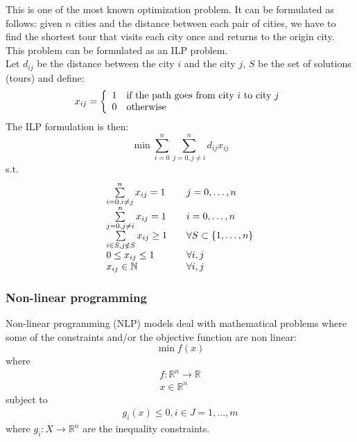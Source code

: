 \begin{example}
This is one of the most known optimization problem. It can be formulated as follows: given $n$ cities and the distance between each pair of cities, we have to find the shortest tour that visits each city once and returns to the origin city. This problem can be formulated as an ILP problem.\\
Let $d_{ij}$ be the distance between the city $i$ and the city $j$, $S$ be the set of solutions (tours) and define:
\begin{equation*}
x_{ij} = \left\{
	\begin{array}{l l}
	1 & \text{if the path goes from city $i$ to city $j$}\\
	0 & \text{otherwise}
	\end{array}
\right.
\end{equation*}
The ILP formulation is then:
\begin{equation*}
\min \sum\limits_{i=0}^{n} \sum\limits_{j=0, j \neq i}^{n} d_{ij} x_{ij}
\end{equation*}
s.t.
\begin{equation*}
\begin{array}{l l}
\sum\limits_{i=0, i \neq j}^{n} x_{ij} = 1 & \quad j = 0, \dots, n\\
\sum\limits_{j=0, j \neq i}^{n} x_{ij} = 1 & \quad i = 0, \dots, n\\
\sum\limits_{i \in S, j \notin S} x_{ij} \geq 1 & \quad \forall S \subset \{1, \dots, n\}\\
0 \leq x_{ij} \leq 1 & \quad \forall i,j\\
x_{ij} \in \mathbb{N} & \quad \forall i,j
\end{array}
\end{equation*}

\end{example}

\subsubsection{Non-linear programming}
Non-linear programming (NLP) models deal with mathematical problems where some of the constraints and/or the objective function are non linear:
\begin{equation}
\min f(x)
\end{equation}
where
\begin{equation*}
\begin{gathered}
f: \mathbb{R}^n \rightarrow \mathbb{R}\\
x \in \mathbb{R}^n
\end{gathered}
\end{equation*}
subject to
\begin{equation*}
\begin{gathered}
g_i(x) \leq 0, i \in J = 1, \dots, m
\end{gathered}
\end{equation*}
where $g_i : X \rightarrow \mathbb{R}^n$ are the inequality constraints.

